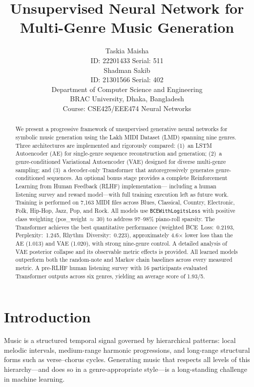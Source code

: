 \documentclass[letterpaper]{article}
\title{Unsupervised Neural Network for Multi-Genre Music Generation}
\author{Taskia Maisha \\
  ID: 22201433 \quad Serial: 511 \\
  \And
  Shadman Sakib \\
  ID: 21301566 \quad Serial: 402 \\
  \AND
  Department of Computer Science and Engineering \\
  BRAC University, Dhaka, Bangladesh \\
  Course: CSE425/EEE474 Neural Networks
}
\begin{document}
\maketitle

\begin{abstract}
We present a progressive framework of unsupervised generative neural networks
for symbolic music generation using the Lakh MIDI Dataset (LMD) spanning nine
genres.  Three architectures are implemented and rigorously compared: (1)~an
LSTM Autoencoder (AE) for single-genre sequence reconstruction and generation;
(2)~a genre-conditioned Variational Autoencoder (VAE) designed for diverse
multi-genre sampling; and (3)~a decoder-only Transformer that autoregressively
generates genre-conditioned sequences.  An optional bonus stage provides a
complete Reinforcement Learning from Human Feedback (RLHF) implementation---
including a human listening survey and reward model---with full training
execution left as future work.  Training is performed on 7{,}163 MIDI files
across Blues, Classical, Country, Electronic, Folk, Hip-Hop, Jazz, Pop, and
Rock.  All models use \texttt{BCEWithLogitsLoss} with positive class weighting
(pos\_weight\,$\approx$\,30) to address 97--98\% piano-roll sparsity.  The
Transformer achieves the best quantitative performance
(weighted BCE~Loss:~0.2193, Perplexity:~1.245, Rhythm~Diversity:~0.223),
approximately 4.6$\times$ lower loss than the AE (1.013) and VAE (1.020),
with strong nine-genre control.  A detailed analysis of VAE posterior
collapse and its observable metric effects is provided.  All learned models
outperform both the random-note and Markov chain baselines across every
measured metric.  A pre-RLHF human listening survey with 16 participants
evaluated Transformer outputs across six genres, yielding an average score
of 1.93/5.
\end{abstract}

\section{Introduction}
\label{sec:intro}

Music is a structured temporal signal governed by hierarchical patterns:
local melodic intervals, medium-range harmonic progressions, and long-range
structural forms such as verse--chorus cycles.  Generating music that
respects all levels of this hierarchy---and does so in a genre-appropriate
style---is a long-standing challenge in machine learning.
\end{document}

